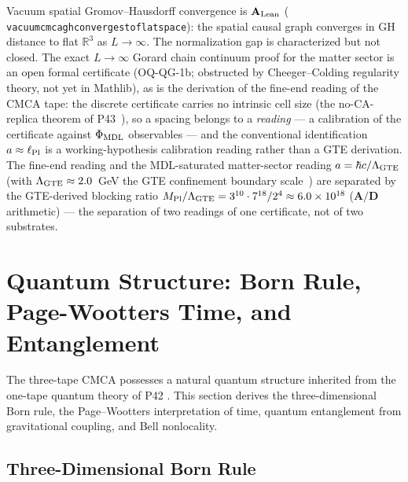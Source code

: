 \documentclass[11pt]{article}
\theoremstyle{remark}
\newcommand{\lean}[1]{%
  \penalty-100
  \begingroup\def\_{\textunderscore\allowbreak}\texttt{#1}\endgroup}
\newcommand{\CatAL}{\ensuremath{\textbf{A}_{\rm Lean}}}
\newcommand{\CatAD}{\textbf{A/D}}
\newcommand{\CMCA}{\text{CMCA}}
\begin{document}
Vacuum spatial Gromov--Hausdorff convergence is \CatAL{}
(\lean{vacuum\_cmca\_gh\_converges\_to\_flat\_space}): the spatial causal graph
converges in GH distance to flat $\mathbb{R}^3$ as $L\to\infty$.
The normalization gap is characterized but not closed. The exact
$L \to \infty$ Gorard chain continuum proof for the matter sector is an open formal
certificate (OQ-QG-1b; obstructed by Cheeger--Colding regularity theory, not yet in
Mathlib), as is
the derivation of the fine-end reading of the $\CMCA$ tape: the discrete
certificate carries no intrinsic cell size (the no-CA-replica theorem of
P43~\cite{SpivackCompleteness}), so a spacing belongs to a \emph{reading}
— a calibration of the certificate against $\Phi_{\rm MDL}$ observables —
and the conventional identification $a \approx \ell_{\rm Pl}$ is a
working-hypothesis calibration reading rather than a GTE derivation.
The fine-end reading and the MDL-saturated matter-sector reading
$a = \hbar c/\Lambda_{\rm GTE}$ (with $\Lambda_{\rm GTE} \approx 2.0$~GeV
the GTE confinement boundary scale~\cite{SpivackGTEQCDStructure,
SpivackSpin7Lattice}) are separated by the GTE-derived blocking ratio
$M_{\rm Pl}/\Lambda_{\rm GTE} = 3^{10}\cdot 7^{18}/2^{4} \approx
6.0\times10^{18}$ ($\CatAD$ arithmetic) — the separation of two readings
of one certificate, not of two substrates.

\FloatBarrier

\section{Quantum Structure: Born Rule, Page-Wootters Time, and Entanglement}
\label{sec:qm}

The three-tape $\CMCA$ possesses a natural quantum structure inherited from
the one-tape quantum theory of P42 \cite{SpivackPhiMDLField}. This section
derives the three-dimensional Born rule, the Page--Wootters interpretation
of time, quantum entanglement from gravitational coupling, and Bell
nonlocality.

\subsection{Three-Dimensional Born Rule}
\end{document}
